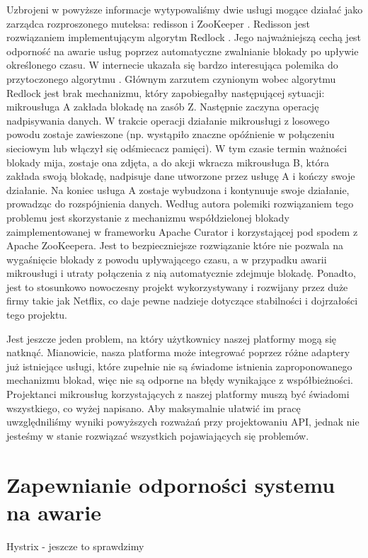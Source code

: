 \documentclass[licencjacka]{pracamgr}
\begin{document}
Uzbrojeni w powyższe informacje wytypowaliśmy dwie usługi mogące działać jako zarządca rozproszonego muteksa:
redisson \cite{redisson} i ZooKeeper \cite{zookeeper}. Redisson jest rozwiązaniem implementującym algorytm Redlock
\cite{redislock}. Jego najważniejszą cechą jest odporność na awarie usług poprzez automatyczne zwalnianie blokady
po upływie określonego czasu. W internecie ukazała się bardzo interesująca polemika do przytoczonego algorytmu \cite{redisbad}.
Głównym zarzutem czynionym wobec algorytmu Redlock jest brak mechanizmu, który zapobiegałby następującej sytuacji:
mikrousługa A zakłada blokadę na zasób Z. Następnie zaczyna operację nadpisywania danych. W trakcie operacji
działanie mikrousługi z losowego powodu zostaje zawieszone (np. wystąpiło znaczne opóźnienie w połączeniu sieciowym
lub włączył się odśmiecacz pamięci). W tym czasie termin ważności blokady mija, zostaje ona zdjęta, a do akcji
wkracza mikrousługa B, która zakłada swoją blokadę, nadpisuje dane utworzone przez usługę A i kończy swoje
działanie. Na koniec usługa A zostaje wybudzona i kontynuuje swoje działanie, prowadząc do rozspójnienia danych.
Według autora polemiki rozwiązaniem tego problemu jest skorzystanie z mechanizmu współdzielonej blokady
zaimplementowanej w frameworku Apache Curator \cite{curatorlock} i korzystającej pod spodem z Apache ZooKeepera.
Jest to bezpieczniejsze rozwiązanie które nie pozwala na wygaśnięcie blokady z powodu upływającego
czasu, a w przypadku awarii mikrousługi i utraty połączenia z nią
automatycznie zdejmuje blokadę. Ponadto, jest to stosunkowo nowoczesny projekt wykorzystywany i rozwijany przez
duże firmy takie jak Netflix, co daje pewne nadzieje dotyczące stabilności i dojrzałości tego projektu.

Jest jeszcze jeden problem, na który użytkownicy naszej platformy mogą się natknąć. Mianowicie, nasza platforma
może integrować poprzez różne adaptery już istniejące usługi, które zupełnie nie są świadome istnienia
zaproponowanego mechanizmu blokad, więc nie są odporne na błędy wynikające z współbieżności.
Projektanci mikrousług korzystających z naszej platformy muszą być świadomi wszystkiego, co wyżej napisano.
Aby maksymalnie ułatwić im pracę uwzględniliśmy wyniki powyższych rozważań  przy projektowaniu API, jednak nie
jesteśmy w stanie rozwiązać wszystkich pojawiających się problemów.

\section{Zapewnianie odporności systemu na awarie}
Hystrix - jeszcze to sprawdzimy
\end{document}
